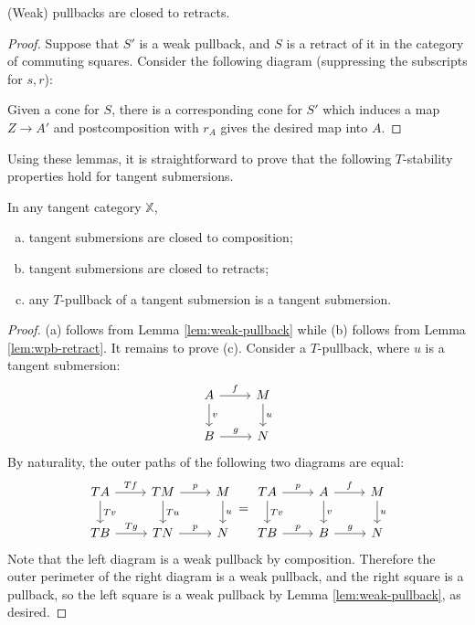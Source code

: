 \begin{lemma}\label{lem:wpb-retract}
    (Weak) pullbacks are closed to retracts.
\end{lemma}
\begin{proof}
    Suppose that $S'$ is a weak pullback, and $S$ is a retract of it in the category of commuting squares. Consider the following diagram (suppressing the subscripts for $s,r$):
    
    Given a cone for $S$, there is a corresponding cone for $S'$ which induces a map $Z \to A'$ and postcomposition with $r_A$ gives the desired map into $A$.
\end{proof}
Using these lemmas, it is straightforward to prove that the following $T$-stability properties hold for tangent submersions.
\begin{lemma}\label{lem:submersion}
    In any tangent category $\mathbb{X}$,
    \begin{enumerate}[(a)]
        \item tangent submersions are closed to composition;
        \item tangent submersions are closed to retracts; 
        \item any $T$-pullback of a tangent submersion is a tangent submersion.
    \end{enumerate}
\end{lemma}
\begin{proof}
    (a) follows from Lemma \ref{lem:weak-pullback} while (b) follows from Lemma \ref{lem:wpb-retract}. It remains to prove (c).     Consider a $T$-pullback, where $u$ is a tangent submersion:
    \[
    \begin{tikzcd}
        A \rar{f} \dar{v} & M \dar{u} \\
        B \rar{g} & N
    \end{tikzcd}
    \]
    By naturality, the outer paths of the following two diagrams are equal: 
    \[
        \begin{tikzcd}
            TA \rar{Tf} \dar{Tv} & TM \rar{p} \dar{Tu} & M \dar{u} \\
            TB \rar{Tg} & TN \rar{p} & N 
        \end{tikzcd}
        =
        \begin{tikzcd}
            TA \rar{p} \dar{Tv} & A \rar{f} \dar{v} & M \dar{u} \\
            TB \rar{p} & B \rar{g} & N
        \end{tikzcd}
    \]
   Note that the left diagram is a weak pullback by composition.  Therefore the outer perimeter of the right diagram is a weak pullback, and the right square is a pullback, so the left square is a weak pullback by Lemma \ref{lem:weak-pullback}, as desired.
\end{proof}
